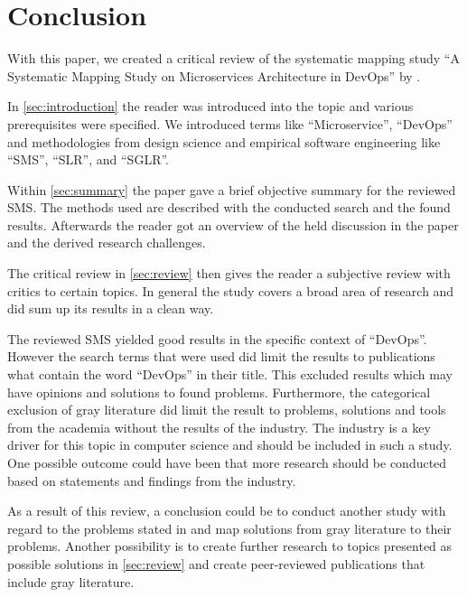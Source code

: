 \section{Conclusion}

With this paper, we created a critical review
of the systematic mapping study
``A Systematic Mapping Study on Microservices Architecture in DevOps''
by \smsAuthors \wsl.

In \autoref{sec:introduction} the reader was introduced into the
topic and various prerequisites were specified. We introduced
terms like ``Microservice'', ``DevOps'' and methodologies from
design science and empirical software engineering like ``SMS'',
``SLR'', and ``SGLR''.

Within \autoref{sec:summary} the paper gave a brief objective
summary for the reviewed SMS. The methods used are described
with the conducted search and the found results. Afterwards
the reader got an overview of the held discussion in the paper
and the derived research challenges.

The critical review in \autoref{sec:review} then gives the
reader a subjective review with critics to certain topics.
In general the study covers a broad area of research
and did sum up its results in a clean way.

The reviewed SMS yielded good results in the specific
context of ``DevOps''. However the search terms that were
used did limit the results to publications what contain the
word ``DevOps'' in their title. This excluded results which
may have opinions and solutions to found problems.
Furthermore, the categorical exclusion of gray literature
did limit the result to problems, solutions and tools from the
academia without the results of the industry. The industry is a key driver
for this topic in computer science and should be
included in such a study. One possible outcome could have been
that more research should be conducted based on statements and
findings from the industry.

As a result of this review, a conclusion could be to conduct
another study with regard to the problems stated in \wsls and
map solutions from gray literature to their problems. Another
possibility is to create further research to topics
presented as possible solutions in \autoref{sec:review} and
create peer-reviewed publications that include gray literature.

